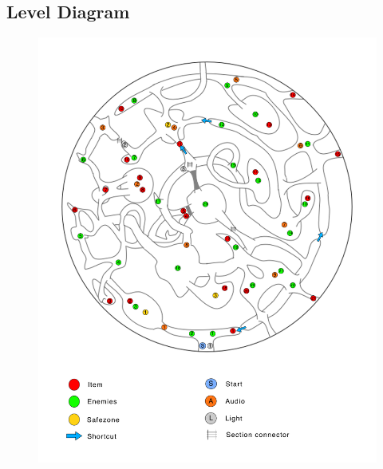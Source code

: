 \subsection{Level Diagram}\label{legend}
\begin{figure}[H]
	\centering
	\includegraphics[width=0.95\linewidth]{images/map/map_legend.png}
\end{figure}
\newpage


